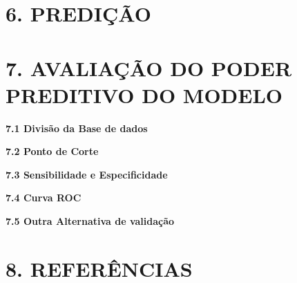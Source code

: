 \documentclass[]{article}
\begin{document}
\section{6. PREDIÇÃO}\label{predicao}

\section{7. AVALIAÇÃO DO PODER PREDITIVO DO
MODELO}\label{avaliacao-do-poder-preditivo-do-modelo}

\textbf{7.1 Divisão da Base de dados}

\textbf{7.2 Ponto de Corte}

\textbf{7.3 Sensibilidade e Especificidade}

\textbf{7.4 Curva ROC}

\textbf{7.5 Outra Alternativa de validação}

\section{8. REFERÊNCIAS}\label{referencias}

\section{}\label{section}
\end{document}
